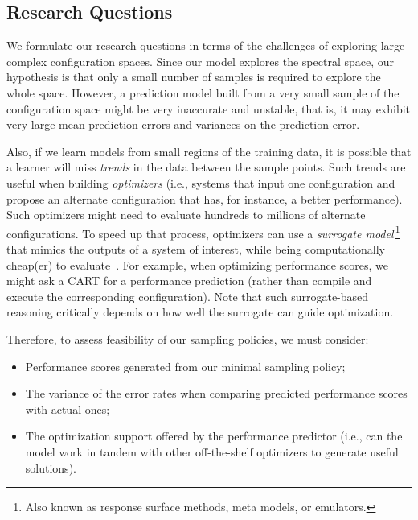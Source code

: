 \documentclass{newsig}
\begin{document}
 
 \subsection{Research Questions}
We formulate our research questions in terms of the challenges of
exploring large complex configuration spaces.
Since our model explores the spectral space, our hypothesis is that only a small
number of samples is required to explore the whole space.
However, a prediction model built from a very small sample of the configuration space might
be very inaccurate and unstable, that is, it may exhibit very large mean prediction errors and variances on the prediction error.

Also, if we learn models from small regions of the training data,
it is  possible that a learner will miss {\em trends} in the data
between the sample points. Such trends are useful when building {\em optimizers}
(i.e., systems that input one configuration and propose an alternate
configuration that has, for instance,  a better performance). Such optimizers might
need to evaluate hundreds to millions of alternate configurations. 
To speed up that process, optimizers can use a {\em surrogate model}\,\footnote{Also known as response surface methods, meta models, or emulators.}
that  mimics the outputs of a system of interest, while being computationally cheap(er) to evaluate~\cite{loshchilov13}. For example, when optimizing
performance scores, we might ask a CART  for a performance
prediction (rather than compile and execute
the corresponding configuration).  Note that such surrogate-based
reasoning critically depends on how well the surrogate can guide optimization.


Therefore, to assess feasibility of our sampling policies, we must consider:
\begin{itemize}
\item Performance scores generated from our minimal sampling policy;
\item The variance of the error rates when comparing predicted performance scores with actual ones;
\item The optimization support offered by the performance predictor (i.e., can the model work in tandem with other off-the-shelf optimizers to generate useful solutions).
\end{itemize}
\end{document}
